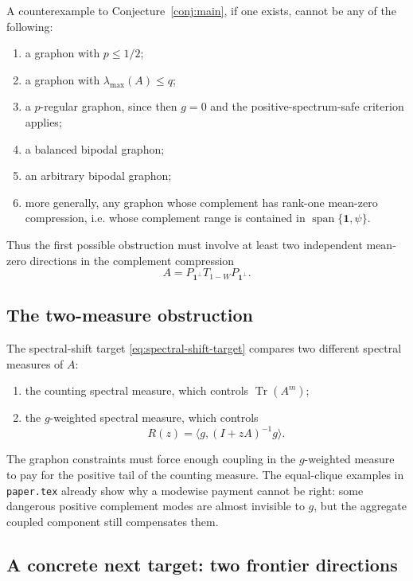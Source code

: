 \documentclass[11pt]{article}
\newcommand{\one}{\mathbf 1}
\newcommand{\ip}[2]{\langle #1,#2\rangle}
\newcommand{\Tr}{\operatorname{Tr}}
\begin{document}
A counterexample to Conjecture~\ref{conj:main}, if one exists, cannot be any of the following:
\begin{enumerate}[label=\textup{(\roman*)}]
    \item a graphon with $p\le1/2$;
    \item a graphon with $\lambda_{\max}(A)\le q$;
    \item a $p$-regular graphon, since then $g=0$ and the positive-spectrum-safe criterion applies;
    \item a balanced bipodal graphon;
    \item an arbitrary bipodal graphon;
    \item more generally, any graphon whose complement has rank-one mean-zero compression, i.e. whose complement range is contained in $\operatorname{span}\{\one,\psi\}$.
\end{enumerate}
Thus the first possible obstruction must involve at least two independent mean-zero directions in the complement compression
\[
        A=P_{\one^\perp}T_{1-W}P_{\one^\perp}.
\]

\subsection{The two-measure obstruction}

The spectral-shift target \eqref{eq:spectral-shift-target} compares two different spectral measures of $A$:
\begin{enumerate}[label=\textup{(\alph*)}]
    \item the counting spectral measure, which controls $\Tr(A^m)$;
    \item the $g$-weighted spectral measure, which controls
    \[
        R(z)=\ip{g}{(I+zA)^{-1}g}.
    \]
\end{enumerate}
The graphon constraints must force enough coupling in the $g$-weighted measure to pay for the positive tail of the counting measure.  The equal-clique examples in \texttt{paper.tex} already show why a modewise payment cannot be right: some dangerous positive complement modes are almost invisible to $g$, but the aggregate coupled component still compensates them.

\subsection{A concrete next target: two frontier directions}
\end{document}
